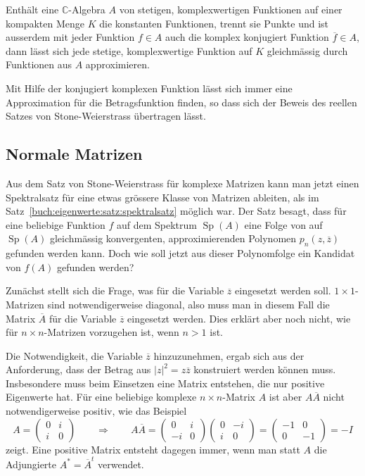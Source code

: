 \begin{satz}
Enthält eine $\mathbb{C}$-Algebra $A$ von stetigen, komplexwertigen
Funktionen auf einer kompakten Menge $K$ die konstanten Funktionen,
trennt sie Punkte und ist ausserdem mit jeder Funktion $f\in A$ auch
die komplex konjugiert Funktion $\overline{f}\in A$,
dann lässt sich jede stetige, komplexwertige Funktion 
auf $K$ gleichmässig durch Funktionen aus $A$ approximieren.
\end{satz}

Mit Hilfe der konjugiert komplexen Funktion lässt sich immer eine
Approximation für die Betragsfunktion finden, so dass sich der
Beweis des reellen Satzes von Stone-Weierstrass übertragen lässt.

%
%
\subsection{Normale Matrizen
\label{buch:subsection:normale-matrizen}}
Aus dem Satz von Stone-Weierstrass für komplexe Matrizen kann man
jetzt einen Spektralsatz für eine etwas grössere Klasse von Matrizen
%
ableiten, als im Satz~\ref{buch:eigenwerte:satz:spektralsatz}
möglich war.
Der Satz besagt, dass für eine beliebige Funktion $f$ auf dem Spektrum
$\operatorname{Sp}(A)$ eine Folge von auf $\operatorname{Sp}(A)$
gleichmässig konvergenten, approximierenden Polynomen
$p_n(z,\overline{z})$ gefunden werden kann.
Doch wie soll jetzt aus dieser Polynomfolge ein Kandidat von $f(A)$
gefunden werden?

Zunächst stellt sich die Frage, was für die Variable $\overline{z}$ 
eingesetzt werden soll.
$1\times 1$-Matrizen sind notwendigerweise diagonal, also muss 
man in diesem Fall die Matrix $\overline{A}$ für die Variable
$\overline{z}$ eingesetzt werden.
Dies erklärt aber noch nicht, wie für $n\times n$-Matrizen
vorzugehen ist, wenn $n>1$ ist.

Die Notwendigkeit, die Variable $\overline{z}$ hinzuzunehmen,
ergab sich aus der Anforderung, dass der Betrag aus $|z|^2=z\overline{z}$
konstruiert werden können muss.
Insbesondere muss beim Einsetzen eine Matrix entstehen, die nur 
positive Eigenwerte hat.
Für eine beliebige komplexe $n\times n$-Matrix $A$ ist aber
$A\overline{A}$ nicht notwendigerweise positiv, wie das Beispiel
\[
A
=
\begin{pmatrix}0&i\\i&0\end{pmatrix}
\qquad
\Rightarrow
\qquad
A\overline{A}
=
\begin{pmatrix}0&i\\-i&0\end{pmatrix}
\begin{pmatrix}0&-i\\i&0\end{pmatrix}
=
\begin{pmatrix}
-1&0\\
 0&-1
\end{pmatrix}
=
-I
\]
zeigt.
Eine positive Matrix entsteht dagegen immer, wenn man statt
$A$ die Adjungierte $A^*=\overline{A}^t$ verwendet.

